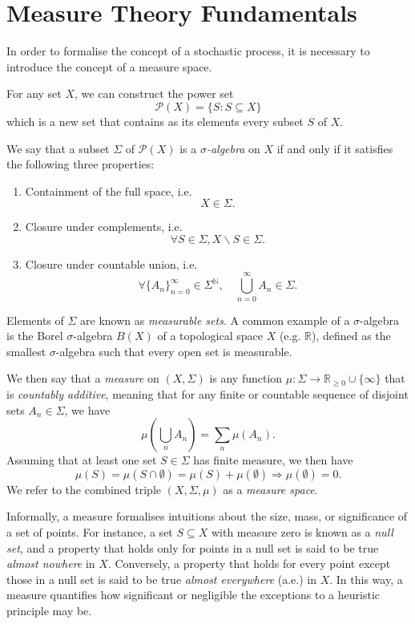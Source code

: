 \documentclass[honours,12pt]{unswthesis}
\def\implies{\Rightarrow}
\numberwithin{equation}{section}
\begin{document}
\section{Measure Theory Fundamentals}
In order to formalise the concept of a stochastic process, it is necessary to introduce the concept of a measure space.

For any set $X$, we can construct the power set
$$\mathcal{P}(X) = \{S : S\subseteq X\}$$
which is a new set that contains as its elements every subset $S$ of $X$.

We say that a subset $\Sigma$ of $\mathcal{P}(X)$ is a  \textit{$\sigma$-algebra} on $X$ if and only if it satisfies the following three properties:
\begin{enumerate}
	\item Containment of the full space, i.e. $$X\in\Sigma.$$
	\item Closure under complements, i.e. $$\forall S \in \Sigma, X\backslash S\in\Sigma.$$
	\item Closure under countable union, i.e. $$\forall \{A_n\}_{n=0}^\infty\in\Sigma^{\mathbb{N}},\quad\bigcup_{n=0}^\infty A_n \in \Sigma.$$
\end{enumerate}
Elements of $\Sigma$ are known as \textit{measurable sets}. A common example of a $\sigma$-algebra is the Borel $\sigma$-algebra $B(X)$ of a topological space $X$ (e.g. $\mathbb{R}$), defined as the smallest $\sigma$-algebra such that every open set is measurable.

We then say that a \textit{measure} on $(X,\Sigma)$ is any function $\mu:\Sigma\to\mathbb{R}_{\geq 0}\cup\{\infty\}$ that is \textit{countably additive}, meaning that for any finite or countable sequence of disjoint sets $A_n\in\Sigma$, we have
$$\mu\left(\bigcup_n A_n\right) = \sum_n \mu(A_n).$$
Assuming that at least one set $S\in\Sigma$ has finite measure, we then have $$\mu(S)=\mu(S\cap\emptyset)=\mu(S)+\mu(\emptyset) \implies \mu(\emptyset)=0.$$
We refer to the combined triple $(X,\Sigma,\mu)$ as a \textit{measure space}.

Informally, a measure formalises intuitions about the size, mass, or significance of a set of points. For instance, a set $S\subseteq X$ with measure zero is known as a \textit{null set}, and a property that holds only for points in a null set is said to be true \textit{almost nowhere} in $X$. Conversely, a property that holds for every point except those in a null set is said to be true \textit{almost everywhere} (a.e.) in $X$. In this way, a measure quantifies how significant or negligible the exceptions to a heuristic principle may be.
\end{document}
